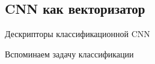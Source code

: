 \subsection{CNN как векторизатор}

\begin{frame}{Дескрипторы классификационной CNN}
    
\end{frame}

\begin{frame}{Вспоминаем задачу классификации}
    
\end{frame}
